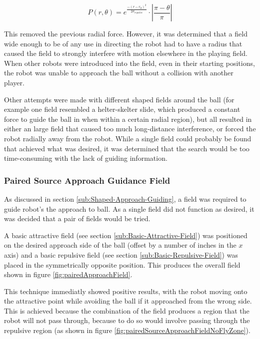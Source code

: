 \documentclass[10pt]{article}
\begin{document}
\begin{equation}
P\left(r,\theta\right)=e^{\frac{-\left(r-r_{0}\right)^{2}}{2\sigma_{repulse}}}\cdot\left|\frac{\pi-\theta}{\pi}\right|\label{eq:insetWrappedGaussian}
\end{equation}

This removed the previous radial force. However, it was determined that a field
wide enough to be of any use in directing the robot had to have a radius that
caused the field to strongly interfere with motion elsewhere in the playing
field. When other robots were introduced into the field, even in their starting
positions, the robot was unable to approach the ball without a collision with
another player.

Other attempts were made with different shaped fields around the ball (for
example one field resembled a helter-skelter slide, which produced a constant
force to guide the ball in when within a certain radial region), but all
resulted in either an large field that caused too much long-distance
interference, or forced the robot radially away from the robot. While a single
field could probably be found that achieved what was desired, it was determined
that the search would be too time-consuming with the lack of guiding
information.

\subsubsection{Paired Source Approach Guidance Field}

As discussed in section \ref{sub:Shaped-Approach-Guiding}, a field was required
to guide robot's the approach to ball. As a single field did not function as
desired, it was decided that a pair of fields would be tried.

A basic attractive field (see section \ref{sub:Basic-Attractive-Field}) was
positioned on the desired approach side of the ball (offset by a number of
inches in the $x$ axis) and a basic repulsive field (see section
\ref{sub:Basic-Repulsive-Field}) was placed in the symmetrically opposite
position. This produces the overall field shown in figure
\ref{fig:pairedApproachField}.

This technique immediatly showed positive results, with the robot moving onto
the attractive point while avoiding the ball if it approached from the wrong
side. This is achieved because the combination of the field produces a region
that the robot will not pass through, because to do so would involve passing
through the repulsive region (as shown in figure
\ref{fig:pairedSourceApproachFieldNoFlyZone}).  
\end{document}
